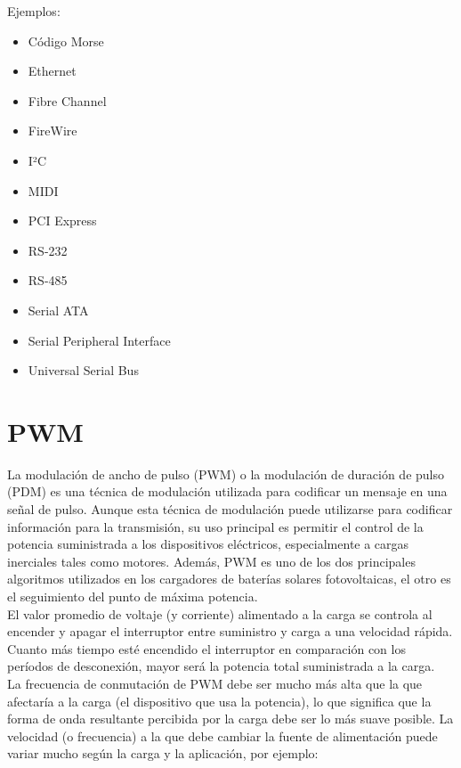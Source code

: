 Ejemplos:\\

\begin{itemize}
 \item Código Morse
 \item Ethernet
 \item Fibre Channel
 \item FireWire
 \item I²C
 \item MIDI
 \item PCI Express
 \item RS-232
 \item RS-485
 \item Serial ATA
 \item Serial Peripheral Interface
 \item Universal Serial Bus
\end{itemize}

\section{PWM}

La modulación de ancho de pulso (PWM) o la modulación de duración de pulso (PDM) es una técnica de modulación utilizada para codificar un mensaje en una señal de pulso. 
Aunque esta técnica de modulación puede utilizarse para codificar información para la transmisión, su uso principal es permitir el control de la potencia suministrada a los
dispositivos eléctricos, especialmente a cargas inerciales tales como motores. Además, PWM es uno de los dos principales algoritmos utilizados en los cargadores de baterías solares
fotovoltaicas, el otro es el seguimiento del punto de máxima potencia.\\

El valor promedio de voltaje (y corriente) alimentado a la carga se controla al encender y apagar el interruptor entre suministro y carga a una velocidad rápida. Cuanto más tiempo
esté encendido el interruptor en comparación con los períodos de desconexión, mayor será la potencia total suministrada a la carga.\\

La frecuencia de conmutación de PWM debe ser mucho más alta que la que afectaría a la carga (el dispositivo que usa la potencia), lo que significa que la forma de onda resultante
percibida por la carga debe ser lo más suave posible. La velocidad (o frecuencia) a la que debe cambiar la fuente de alimentación puede variar mucho según la carga y la aplicación,
por ejemplo:\\

